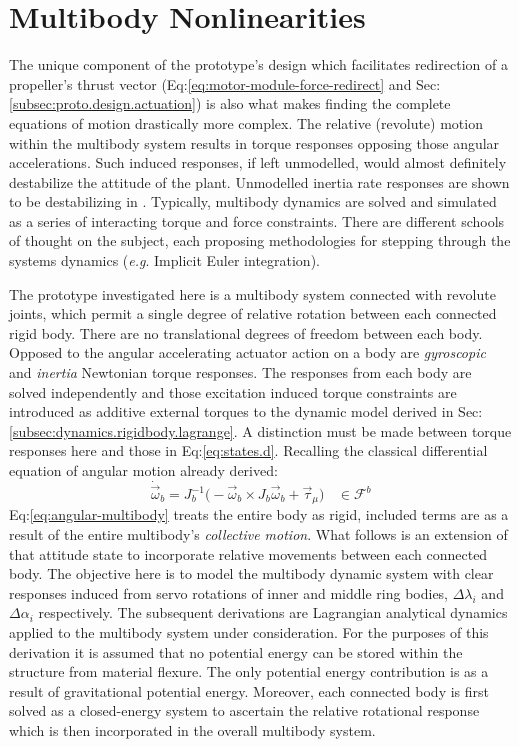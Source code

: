 \section{Multibody Nonlinearities}
\label{sec:dynamics.nonlinearities}
The unique component of the prototype's design which facilitates redirection of a propeller's thrust vector (Eq:\ref{eq:motor-module-force-redirect} and Sec:\ref{subsec:proto.design.actuation}) is also what makes finding the complete equations of motion drastically more complex. The relative (revolute) motion within the multibody system results in torque responses opposing those angular accelerations. Such induced responses, if left unmodelled, would almost definitely destabilize the attitude of the plant. Unmodelled inertia rate responses are shown to be destabilizing in \cite{inertiaspin}. Typically, multibody dynamics are solved and simulated as a series of interacting torque and force constraints. There are different schools of thought on the subject, each proposing methodologies for stepping through the systems dynamics (\emph{e.g}. Implicit Euler integration\cite{physicallybased,multibodydynamics}).
\par
The prototype investigated here is a multibody system connected with revolute joints, which permit a single degree of relative rotation between each connected rigid body. There are no translational degrees of freedom between each body. Opposed to the angular accelerating actuator action on a body are \emph{gyroscopic} and \emph{inertia} Newtonian torque responses. The responses from each body are solved independently and those excitation induced torque constraints are introduced as additive external torques to the dynamic model derived in Sec:\ref{subsec:dynamics.rigidbody.lagrange}. A distinction must be made between torque responses here and those in Eq:\ref{eq:states.d}. Recalling the classical differential equation of angular motion already derived:
\begin{equation}\label{eq:angular-multibody}
\dot{\vec{\omega}}_b=J_b^{-1}\big(-\vec{\omega}_b\times J_b\vec{\omega}_b+\vec{\tau}_\mu\big)~~~~\in\mathcal{F}^b
\end{equation}
Eq:\ref{eq:angular-multibody} treats the entire body as rigid, included terms are as a result of the entire multibody's \emph{collective motion}. What follows is an extension of that attitude state to incorporate relative movements between each connected body. The objective here is to model the multibody dynamic system with clear responses induced from servo rotations of inner and middle ring bodies, $\Delta\lambda_i$ and $\Delta\alpha_i$ respectively. The subsequent derivations are Lagrangian analytical dynamics applied to the multibody system under consideration. For the purposes of this derivation it is assumed that no potential energy can be stored within the structure from material flexure. The only potential energy contribution is as a result of gravitational potential energy. Moreover, each connected body is first solved as a closed-energy system to ascertain the relative rotational response which is then incorporated in the overall multibody system.
